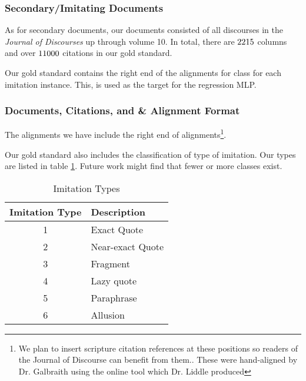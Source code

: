 \subsubsection{Secondary/Imitating Documents}
As for secondary documents, our documents consisted of all discourses in the \textit{Journal of Discourses} up through volume 10. In total, there are $2215$ columns and over $11000$ citations in our gold standard.

Our gold standard contains the right end of the alignments for class for each imitation instance. This, is used as the target for the regression MLP. %


\subsubsection{Documents, Citations, and \& Alignment Format}
The alignments we have include the right end of alignments\footnote{We plan to insert scripture citation references at these positions so readers of the Journal of Discourse can benefit from them.. These were hand-aligned by Dr. Galbraith using the online tool which Dr. Liddle produced}.

Our gold standard also includes the classification of type of imitation. Our types are listed in table \ref{tab:imitation-types}. Future work might find that fewer or more classes exist.

\begin{table}[center]
	\begin{center}
		\begin{tabular}{|c|l|} \hline
			\textbf{Imitation Type}	& \textbf{Description}		\\ \hline \hline
			1						& Exact Quote				\\ \hline
			2						& Near-exact Quote			\\ \hline
			3						& Fragment					\\ \hline
			4						& Lazy quote				\\ \hline
			5						& Paraphrase				\\ \hline
			6						& Allusion					\\ \hline
		\end{tabular}
	\end{center}
	
	\caption{Imitation Types}
	\label{tab:imitation-types}
\end{table}

